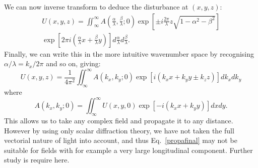 \documentclass[12pt,a4paper]{article}
\begin{document}
We can now inverse transform to deduce the disturbance at \((x,y,z)\):
\begin{multline}
	\label{propa}
	U\!\left(x,y,z\right)=\iint_{\infty}^{\infty}A\!\left(\frac{\alpha}{\lambda},\frac{\beta}{\lambda};0\right)\exp\left[\pm i\frac{2\pi}{\lambda}z\sqrt{1-\alpha^{2}-\beta^{2}}\right]	\\				\exp\left[2\pi i\left(\frac{\alpha}{\lambda}x+\frac{\beta}{\lambda}y\right)\right]d\frac{\alpha}{\lambda}d\frac{\beta}{\lambda}.
\end{multline}
Finally, we can write this in the more intuitive wavenumber space by recognising \(\alpha/\lambda=k_{x}/2\pi\) and so on, giving:
\begin{equation}
	\label{propafinal}
	U\!\left(x,y,z\right)=\frac{1}{4\pi^{2}}\iint_{\infty}^{\infty}A\!\left(k_{x},k_{y};0\right)	\exp\left[i\left(k_{x}x+k_{y}y\pm k_{z}z\right)\right]dk_{x}dk_{y}
\end{equation}
where
\begin{equation}
	\label{fourierfinal}
	A\!\left(k_{x},k_{y};0\right)=\iint_{\infty}^{\infty}U\!\left(x,y,0\right)\exp\left[-i\left(k_{x}x+k_{y}y\right)\right]dxdy.
\end{equation}
This allows us to take any complex field and propagate it to any distance. However by using only scalar diffraction theory, we have not taken the full vectorial nature of light into account, and thus Eq.~\eqref{propafinal} may not be suitable for fields with for example a very large longitudinal component. Further study is require here.


\end{document}
